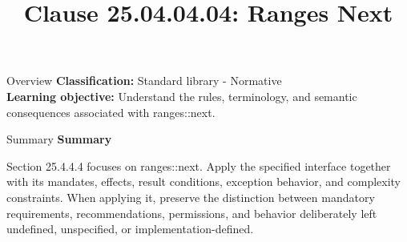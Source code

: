 \documentclass[10pt,letterpaper]{article}
\title{Clause 25.04.04.04: Ranges Next}
\author{}
\date{}
\begin{document}
\maketitle
\begin{CornellOverviewBox}{Overview}
\textbf{Classification:} Standard library - Normative\\[2pt]
\textbf{Learning objective:} Understand the rules, terminology, and semantic consequences associated with ranges::next.
\end{CornellOverviewBox}\begin{CornellSummaryBox}{Summary}
{\sffamily\bfseries\color{Accent} Summary}\par\vspace{3pt}Section 25.4.4.4 focuses on ranges::next. Apply the specified interface together with its mandates, effects, result conditions, exception behavior, and complexity constraints. When applying it, preserve the distinction between mandatory requirements, recommendations, permissions, and behavior deliberately left undefined, unspecified, or implementation-defined.
\end{CornellSummaryBox}
\end{document}
